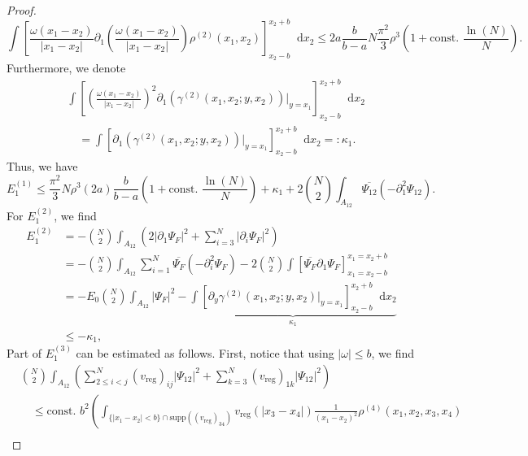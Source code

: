 \documentclass[a4paper,11pt]{article}
\newcommand{\supp}{\text{supp}}
\newcommand{\abs}[1]{\left\lvert #1 \right\rvert}
\newcommand*\diff{\mathop{}\!\mathrm{d}}
\numberwithin{equation}{section}
\begin{document}
\begin{proof}
\begin{equation}
		\int\left[\frac{\omega(x_1-x_2)}{\abs{x_1-x_2}}\partial_{1}\left(\frac{\omega(x_1-x_2)}{\abs{x_1-x_2}}\right)\rho^{(2)}(x_1,x_2)\right]_{x_2-b}^{x_2+b}\diff x_2\leq 2a\frac{b}{b-a} N\frac{\pi^2}{3}\rho^3\left(1+\text{const. }\frac{\ln(N)}{N}\right).
		\end{equation}
		Furthermore, we denote \begin{equation}\label{EqGammaDeriv2.}
		\begin{aligned}
		&\int\left[\left(\frac{\omega(x_1-x_2)}{\abs{x_1-x_2}}\right)^2\partial_{1}\left(\gamma^{(2)}(x_1,x_2;y,x_2)\right)\bigg\vert_{y=x_1}\right]_{x_2-b}^{x_2+b}\diff x_2\\
		&\quad=\int\left[\partial_{1}\left(\gamma^{(2)}(x_1,x_2;y,x_2)\right)\bigg\vert_{y=x_1}\right]_{x_2-b}^{x_2+b}\diff x_2=:\kappa_1.
		\end{aligned}
		\end{equation}
		Thus, we have \begin{equation}
		E_1^{(1)}\leq\frac{\pi^2}{3}N\rho^3 (2a)\frac{b}{b-a}\left(1+\text{const. }\frac{\ln(N)}{N}\right)+\kappa_1+2\binom{N}{2}\int_{A_{12}}\overline{\Psi_{12}}(-\partial^2_1\Psi_{12}).
		\end{equation}
		For $E_1^{(2)}$, we find \begin{equation}
		\begin{aligned}
		E_1^{(2)}&=-\binom{N}{2}\int_{A_{12}}\left(2\abs{\partial_1\Psi_F}^2+\sum_{i=3}^{N}\abs{\partial_i\Psi_F}^2\right)\\&=-\binom{N}{2}\int_{A_{12}}\sum_{i=1}^{N}\overline{\Psi_F}(-\partial^2_i\Psi_F)-2\binom{N}{2}\int\left[\overline{\Psi_F}\partial_1\Psi_F\right]_{x_1=x_2-b}^{x_1=x_2+b}\\
		&=-E_0\binom{N}{2}\int_{A_{12}}\abs{\Psi_F}^2-\underbrace{\int\left[\partial_y\gamma^{(2)}(x_1,x_2;y,x_2)\vert_{y=x_1}\right]_{x_2-b}^{x_2+b} \diff x_2}_{\kappa_1}\\
        &\leq -\kappa_1,
		\end{aligned}
		\end{equation}
		Part of $E_1^{(3)}$ can be estimated as follows.
		First, notice that using $\abs{\omega}\leq b$, we find\begin{equation}
		\begin{aligned}
		&\binom{N}{2}\int_{A_{12}} \left(\sum_{2\leq i<j}^{N}(v_{\text{reg}})_{ij}\abs{\Psi_{12}}^2+\sum_{k=3}^{N}(v_{\text{reg}})_{1k}\abs{\Psi_{12}}^2\right)\\&\quad\leq \text{const. }b^2 \left(\int_{\{\abs{x_1-x_2}<b\}\cap\supp((v_{\text{reg}})_{34})}v_{\text{reg}}(\abs{x_3-x_4})\frac{1}{(x_1-x_2)^2}\rho^{(4)}(x_1,x_2,x_3,x_4)\right.\\

\end{aligned}
\end{equation}
\end{proof}
\end{document}
